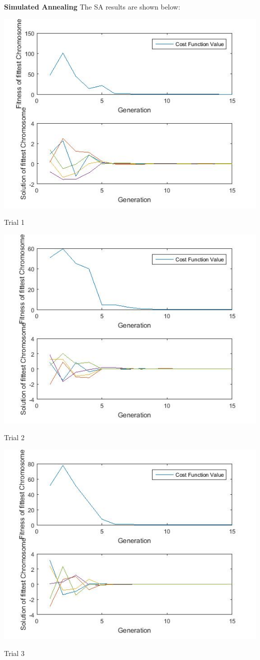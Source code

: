 \documentclass{article}
\begin{document}
\textbf{Simulated Annealing} The SA results are shown below:\\
\centerline{\includegraphics[width=0.5\linewidth]{sa_tf4_a}}
\centerline{Trial 1}
\centerline{\includegraphics[width=0.5\linewidth]{sa_tf4_b}}
\centerline{Trial 2}
\centerline{\includegraphics[width=0.5\linewidth]{sa_tf4_c}}
\centerline{Trial 3}
\end{document}
